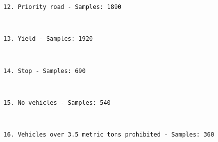 \documentclass[11pt]{article}
\begin{document}
    \begin{Verbatim}[commandchars=\\\{\}]
12. Priority road - Samples: 1890

    \end{Verbatim}

    \begin{center}
    \end{center}
    { \hspace*{\fill} \\}
    
    \begin{Verbatim}[commandchars=\\\{\}]
13. Yield - Samples: 1920

    \end{Verbatim}

    \begin{center}
    \end{center}
    { \hspace*{\fill} \\}
    
    \begin{Verbatim}[commandchars=\\\{\}]
14. Stop - Samples: 690

    \end{Verbatim}

    \begin{center}
    \end{center}
    { \hspace*{\fill} \\}
    
    \begin{Verbatim}[commandchars=\\\{\}]
15. No vehicles - Samples: 540

    \end{Verbatim}

    \begin{center}
    \end{center}
    { \hspace*{\fill} \\}
    
    \begin{Verbatim}[commandchars=\\\{\}]
16. Vehicles over 3.5 metric tons prohibited - Samples: 360

    \end{Verbatim}
\end{document}
